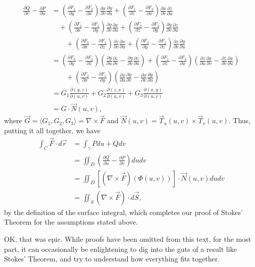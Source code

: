 \begin{align*}
 \frac{\partial Q}{\partial v}-\frac{\partial P}{\partial u} & = \left(\frac{\partial F_1}{\partial y}-\frac{\partial F_2}{\partial x}\right)\frac{\partial x}{\partial v}\frac{\partial y}{\partial u}+\left(\frac{\partial F_1}{\partial z}-\frac{\partial F_3}{\partial x}\right)\frac{\partial x}{\partial v}\frac{\partial z}{\partial u}\\
&\quad + \left(\frac{\partial F_2}{\partial x}-\frac{\partial F_1}{\partial y}\right)\frac{\partial y}{\partial v}\frac{\partial x}{\partial u}+\left(\frac{\partial F_2}{\partial z}-\frac{\partial F_3}{\partial y}\right)\frac{\partial y}{\partial v}\frac{\partial z}{\partial u}\\
&  \quad \quad + \left(\frac{\partial F_3}{\partial x}-\frac{\partial F_1}{\partial z}\right)\frac{\partial z}{\partial v}\frac{\partial x}{\partial u}+\left(\frac{\partial F_3}{\partial y}-\frac{\partial F_2}{\partial z}\right)\frac{\partial z}{\partial v}\frac{\partial y}{\partial u}\\
& = \left(\frac{\partial F_3}{\partial y}-\frac{\partial F_2}{\partial z}\right)\left(\frac{\partial y}{\partial u}\frac{\partial z}{\partial v}-\frac{\partial y}{\partial v}\frac{\partial z}{\partial u}\right)+\left(\frac{\partial F_1}{\partial z}-\frac{\partial F_3}{\partial x}\right)\left(\frac{\partial z}{\partial u}\frac{\partial x}{\partial v}-\frac{\partial z}{\partial v}\frac{\partial x}{\partial u}\right)\\
&\quad \quad +\left(\frac{\partial F_2}{\partial x}-\frac{\partial F_1}{\partial y}\right)\left(\frac{\partial x}{\partial u}\frac{\partial y}{\partial v}-\frac{\partial x}{\partial v}\frac{\partial y}{\partial u}\right)\\
& = G_1\frac{\partial(y,z)}{\partial(u,v)}+G_2\frac{\partial(z,x)}{\partial (u,v)}+G_3\frac{\partial (x,y)}{\partial (u,v)}\\
& = G\cdot \vec{N}(u,v),
\end{align*}
where $\vec{G} = \langle G_1,G_2,G_3\rangle = \nabla\times \vec{F}$ and $\vec{N}(u,v) = \vec{T}_u(u,v)\times\vec{T}_v(u,v)$. Thus, putting it all together, we have
\begin{align*}
 \int_C \vec{F}\cdot d\vec{r} & = \int_\gamma Pdu+Qdv \\
& = \iint_D \left(\frac{\partial Q}{\partial u}-\frac{\partial P}{\partial v}\right)dudv\\
& = \iint_D \left[(\nabla\times \vec{F})(\Phi(u,v))\right]\cdot \vec{N}(u,v) dudv\\
& = \iint_S \left(\nabla\times \vec{F}\right)\cdot d\vec{S},
\end{align*}
by the definition of the surface integral, which completes our proof of Stokes' Theorem for the assumptions stated above.

\bigskip

OK, that was epic. While proofs have been omitted from this text, for the most part, it can occasionally be enlightening to dig into the guts of a result like Stokes' Theorem, and try to understand how everything fits together.


